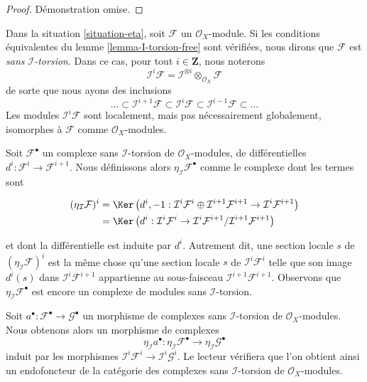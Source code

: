 {\begin{lemma}
\begin{enumerate}
\end{enumerate}

\end{lemma}

\begin{proof}
Démonstration omise.
\end{proof}

\noindent
Dans la situation \ref{situation-eta}, soit $\mathcal{F}$ un $\mathcal{O}_X$-module. Si les conditions équivalentes du lemme \ref{lemma-I-torsion-free} sont vérifiées, nous dirons que $\mathcal{F}$ est {\it sans $\mathcal{I}$-torsion}. Dans ce cas, pour tout $i \in \mathbf{Z}$, nous noterons $$
\mathcal{I}^i\mathcal{F} =
\mathcal{I}^{\otimes i} \otimes_{\mathcal{O}_X} \mathcal{F}
$$ de sorte que nous ayons des inclusions $$
\ldots \subset
\mathcal{I}^{i + 1}\mathcal{F} \subset
\mathcal{I}^i\mathcal{F} \subset
\mathcal{I}^{i - 1}\mathcal{F} \subset \ldots
$$ Les modules $\mathcal{I}^i\mathcal{F}$ sont localement, mais pas nécessairement globalement, isomorphes à $\mathcal{F}$ comme $\mathcal{O}_X$-modules.

\medskip\noindent

Soit $\mathcal{F}^\bullet$ un complexe sans $\mathcal{I}$-torsion de $\mathcal{O}_X$-modules, de différentielles $d^i : \mathcal{F}^i \to \mathcal{F}^{i + 1}$. Nous définissons alors $\eta_\mathcal{I}\mathcal{F}^\bullet$
comme le complexe dont les termes sont

\begin{align*}
(\eta_\mathcal{I}\mathcal{F})^i
& =
\Ker\left(
d^i, -1 :
\mathcal{I}^i\mathcal{F}^i \oplus \mathcal{I}^{i + 1}\mathcal{F}^{i + 1}
\to
\mathcal{I}^i\mathcal{F}^{i + 1}
\right) \\
& =
\Ker\left(d^i :
\mathcal{I}^i\mathcal{F}^i
\to
\mathcal{I}^i\mathcal{F}^{i + 1}/
\mathcal{I}^{i + 1}\mathcal{F}^{i + 1}
\right)
\end{align*}

et dont la différentielle est induite par $d^i$. Autrement dit, une section locale
$s$ de $(\eta_\mathcal{I}\mathcal{F})^i$ est la même chose qu'une section locale
$s$ de $\mathcal{I}^i\mathcal{F}^i$ telle que son image $d^i(s)$
dans $\mathcal{I}^i\mathcal{F}^{i + 1}$ appartienne au sous-faisceau
$\mathcal{I}^{i + 1}\mathcal{F}^{i + 1}$. Observons que $\eta_\mathcal{I}\mathcal{F}^\bullet$
est encore un complexe de modules sans $\mathcal{I}$-torsion.

\medskip\noindent
Soit $a^\bullet : \mathcal{F}^\bullet \to \mathcal{G}^\bullet$ un morphisme de complexes sans $\mathcal{I}$-torsion de $\mathcal{O}_X$-modules. Nous obtenons alors un morphisme de complexes $$
\eta_\mathcal{I} a^\bullet :
\eta_\mathcal{I}\mathcal{F}^\bullet
\longrightarrow
\eta_\mathcal{I}\mathcal{G}^\bullet
$$ induit par les morphismes $\mathcal{I}^i\mathcal{F}^i \to \mathcal{I}^i\mathcal{G}^i$. Le lecteur vérifiera que l'on obtient ainsi un endofoncteur de la catégorie des complexes sans $\mathcal{I}$-torsion de $\mathcal{O}_X$-modules.

}
